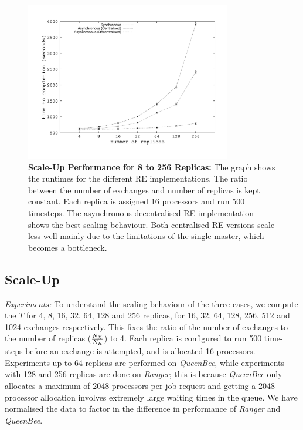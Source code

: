 \documentclass{rspublic}
\newcommand{\alnote}[1]{ {\textcolor{blue} { ***andre: #1 }}}
\newcommand{\athotanote}[1]{ {\textcolor{green} { ***athota: #1 }}}
\newcommand{\alnote}[1]{}
\newcommand{\athotanote}[1]{}
\begin{document}
%
\begin{figure}
\centering
\includegraphics[width=0.8\textwidth]{../data/scale_up.pdf}
\caption{\small \textbf{Scale-Up Performance for 8 to 256 Replicas:}
  The graph shows the runtimes for the different RE implementations.
  The ratio between the number of exchanges and number of replicas is
  kept constant. Each replica is assigned 16 processors and run 500
  timesteps.  The asynchronous decentralised RE implementation shows
  the best scaling behaviour. Both centralised RE versions scale less
  well mainly due to the limitations of the single master, which
  becomes a
  bottleneck.}%
\label{fig:scaleup}
\vspace{-1em}
\end{figure}


\subsection{Scale-Up}


{\it Experiments: } To understand the scaling behaviour of the three
cases, we compute the $T$ for 4, 8, 16, 32, 64, 128 and 256 replicas,
for 16, 32, 64, 128, 256, 512 and 1024 exchanges respectively. This
fixes the ratio of the number of exchanges to the number of replicas
($N_X \over N_R$) to 4.  Each replica is configured to run 500
time-steps before an exchange is attempted, and is allocated 16
processors. Experiments up to 64 replicas are performed on {\it
  QueenBee}, while experiments with 128 and 256 replicas are done on
\emph{Ranger}; this is because \emph{QueenBee} only allocates a
maximum of 2048 processors per job request and getting a 2048
processor allocation involves extremely large waiting times in the
queue. We have normalised the data to factor in the difference in
performance of {\it Ranger} and {\it QueenBee}.
\end{document}
